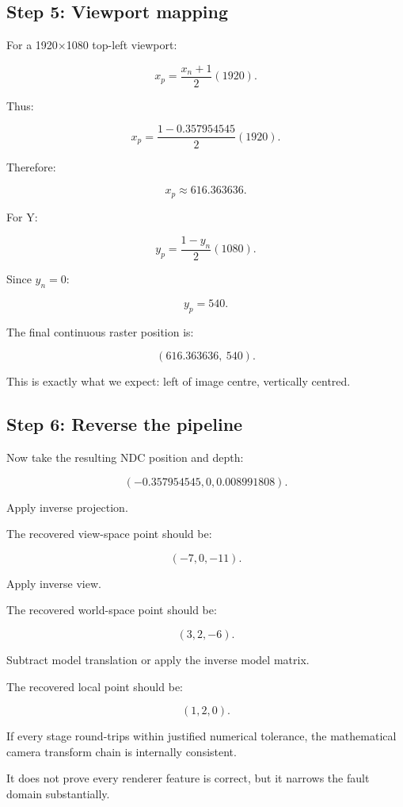 \subsection{Step 5: Viewport mapping}\label{02-foundations-ii-ch037-step-5-viewport-mapping}

For a 1920×1080 top-left viewport:

\[ x_p=\frac{x_n+1}{2}(1920). \]

Thus:

\[ x_p= \frac{1-0.357954545}{2}(1920). \]

Therefore:

\[ \boxed{x_p\approx616.363636}. \]

For Y:

\[ y_p=\frac{1-y_n}{2}(1080). \]

Since \(y_n=0\):

\[ \boxed{y_p=540}. \]

The final continuous raster position is:

\[ \boxed{ (616.363636,\ 540). } \]

This is exactly what we expect: left of image centre, vertically centred.

\subsection{Step 6: Reverse the pipeline}\label{02-foundations-ii-ch037-step-6-reverse-the-pipeline}

Now take the resulting NDC position and depth:

\[ (-0.357954545,0,0.008991808). \]

Apply inverse projection.

The recovered view-space point should be:

\[ \boxed{(-7,0,-11)}. \]

Apply inverse view.

The recovered world-space point should be:

\[ \boxed{(3,2,-6)}. \]

Subtract model translation or apply the inverse model matrix.

The recovered local point should be:

\[ \boxed{(1,2,0)}. \]

If every stage round-trips within justified numerical tolerance, the mathematical camera transform chain is internally consistent.

It does not prove every renderer feature is correct, but it narrows the fault domain substantially.

